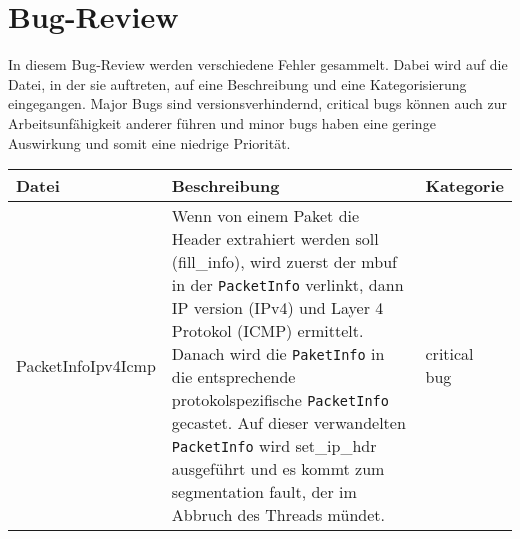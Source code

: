 \documentclass[../review_3.tex]{subfiles}
\begin{document}
\chapter{Bug-Review}\thispagestyle{fancy}

In diesem Bug-Review werden verschiedene Fehler gesammelt. Dabei wird auf die Datei, in der sie auftreten, auf eine Beschreibung und eine Kategorisierung eingegangen. Major Bugs sind versionsverhindernd, critical bugs können auch zur Arbeitsunfähigkeit anderer führen und minor bugs haben eine geringe Auswirkung und somit eine niedrige Priorität.

\begin{longtable} [h] {p{3cm} p{8.7cm} l}
    \toprule
    \textbf{Datei}                                                                                                                                                                                                                                                                                                                                                                                                                                          & \textbf{Beschreibung} & \textbf{Kategorie} \\ \endhead
    \midrule

    PacketInfoIpv4Icmp                                                                                                                                                                                                                                                                                                                                                                                                                                      &
    Wenn von einem Paket die Header extrahiert werden soll (fill\_info), wird zuerst der mbuf in der \texttt{PacketInfo} verlinkt, dann IP version (IPv4) und Layer 4 Protokol (ICMP) ermittelt. Danach wird die \texttt{PaketInfo} in die entsprechende protokolspezifische \texttt{PacketInfo} gecastet. Auf dieser verwandelten \texttt{PacketInfo} wird set\_ip\_hdr ausgeführt und es kommt zum segmentation fault, der im Abbruch des Threads mündet. &
    critical bug                                                                                                                                                                                                                                                                                                                                                                                                                                                                                         \\


\end{longtable}
\end{document}
